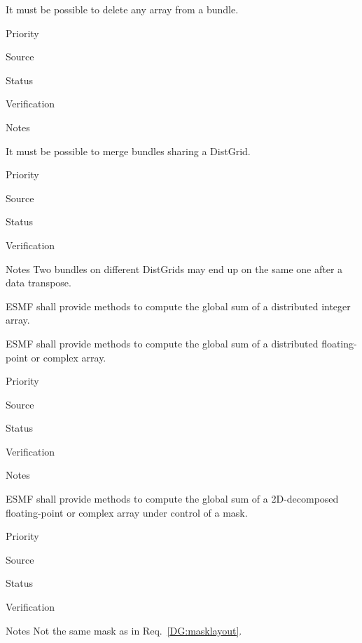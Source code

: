 
It must be possible to delete any array from a bundle.

\begin{reqlist}
\item[Priority]
\item[Source]
\item[Status]
\item[Verification]
\item[Notes]
\end{reqlist}


It must be possible to merge bundles sharing a DistGrid.

\begin{reqlist}
\item[Priority]
\item[Source]
\item[Status]
\item[Verification]
\item[Notes] Two bundles on different DistGrids may end up on the same
  one after a data transpose.
\end{reqlist}



ESMF shall provide methods to compute the global sum of a distributed
integer array.


ESMF shall provide methods to compute the global sum of a distributed
floating-point or complex array.

\begin{reqlist}
\item[Priority]
\item[Source]
\item[Status]
\item[Verification]
\item[Notes]
\end{reqlist}

 \label{DG:masksum}

ESMF shall provide methods to compute the global sum of a 2D-decomposed
floating-point or complex array under control of a mask.

\begin{reqlist}
\item[Priority]
\item[Source]
\item[Status]
\item[Verification]
\item[Notes] Not the same mask as in Req.~\ref{DG:masklayout}.
\end{reqlist}

